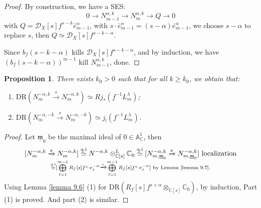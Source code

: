 \documentclass[openany]{book}
\newtheorem{proposition}[theorem]{Proposition} %
\theoremstyle{definition} %
\theoremstyle{remark}
\begin{document}
\begin{proof}
    By construction, we have a SES: $$0\longrightarrow N_{m-1}^{\alpha,k} \longrightarrow N_m^{\alpha,k} \longrightarrow Q \longrightarrow 0$$with $Q=\mathcal{D}_{X}[s]f^{s-k}\bar{e}_{m-1}^{\alpha}$, with $s\cdot \bar{e}^\alpha_{m-1}=(s-\alpha)\overline{e}^\alpha_{m-1}$, we choose $s-\alpha$ to replace $s$, then  $Q\simeq \mathcal{D}_{X}[s]f^{s-k-\alpha}$.

    Since $b_{f}(s-k-\alpha)$ kills $\mathcal{D}_{X}[s]f^{s-k-\alpha}$, and by induction, we have $(b_f(s-k-\alpha))^{m -1}$ kill $N_{m-1}^{\alpha,k}$, done.
\end{proof}
\begin{proposition}
    There exists $k_0 > 0$ such that for all $k \geq k_0$, we obtain that:
    \begin{enumerate}
        \item $\mathrm{DR}(N_m^{-\alpha,k} \xrightarrow{s} N_{m}^{-\alpha,k}) \simeq R j_*\left(f^{-1} L_m^{\lambda}\right)$;
        \item $\mathrm{DR}(N_m^{-\alpha,-k} \xrightarrow{s} N_{m}^{-\alpha,-k})\simeq j_!\left(f^{-1} L_m^{\lambda}\right)$.
    \end{enumerate}
\end{proposition}
\begin{proof}
    Let $\underline{\mathfrak{m}}_0$ be the maximal ideal of $0 \in \mathbb{A}_{\mathbb{C}}^1$, then $$[N_{m}^{-\alpha,k} \xrightarrow{s} N_{m}^{-\alpha,k}]\stackrel{\text{q.i}}{\simeq}N^{-\alpha,k} \otimes^{L}_{\mathbb{C}[s]} \mathbb{C}_{0} \stackrel{\text{q.i}}{\simeq} [N^{-\alpha,k}_{m,\underline{\mathfrak{m}}_{0}} \xrightarrow{s}N^{-\alpha,k}_{m,\underline{\mathfrak{m}}_{0}}]\text{ localization}\atop \stackrel{\text{q.i}}{\simeq}[\bigoplus \limits_{\ell=1}^{m-1} R_{f}[s]f^{s} \cdot e_{\ell}^{-\alpha} \xrightarrow{s} \bigoplus \limits_{\ell=1}^{m-1}R_{f}[s]f^{s} \cdot e_{\ell}^{-\alpha}]\text{ by Lemma \ref{lemma 9.7}}.$$Using Lemma \ref{lemma 9.6} (1) for $\mathrm{DR}(R_{f}[s]f^{s+\alpha}\otimes_{\mathbb{C}[s]}\mathbb{C}_{0})$, by induction, Part (1) is proved. And part (2) is similar.
\end{proof}
\end{document}
